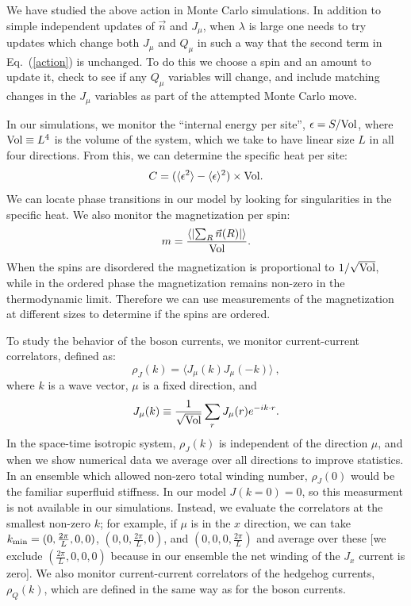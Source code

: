 \documentclass[prb,twocolumn]{revtex4-1}
\def\ra{\rangle} %
\def\la{\langle} %
\begin{document}
We have studied the above action in Monte Carlo simulations. In addition to simple independent updates of $\vec{n}$ and $J_\mu$, when $\lambda$ is large one needs to try updates which change both $J_\mu$ and $Q_\mu$ in such a way that the second term in Eq.~(\ref{action}) is unchanged. To do this we choose a spin and an amount to update it, check to see if any $Q_\mu$ variables will change, and include matching changes in the $J_\mu$ variables as part of the attempted Monte Carlo move.

In our simulations, we monitor the ``internal energy per site'', $\epsilon= S /{\rm Vol}$, where ${\rm Vol}\equiv L^4$ is the volume of the system, which we take to have linear size $L$ in all four directions. From this, we can determine the specific heat per site:
\begin{equation}
C=(\la \epsilon^2\ra-\la\epsilon\ra^2)\times{\rm Vol}.
\end{equation}
We can locate phase transitions in our model by looking for singularities in the specific heat. We also monitor the magnetization per spin:
\begin{equation}
m = \frac{\left\la \left|\sum_R \vec{n}(R) \right|\right\ra}{\rm Vol}.
\end{equation}
When the spins are disordered the magnetization is proportional to $1/\sqrt{\rm Vol}$, while in the ordered phase the magnetization remains non-zero in the thermodynamic limit. Therefore we can use measurements of the magnetization at different sizes to determine if the spins are ordered.

To study the behavior of the boson currents, we monitor current-current correlators, defined as:
\begin{equation}
\rho_{J}({k})=\la J_\mu({k})J_\mu(-{k})\ra ~,
\label{rho}
\end{equation}
where $k$ is a wave vector, $\mu$ is a fixed direction, and 
\begin{equation}
J_\mu({k})\equiv\frac{1}{\rm \sqrt{Vol}}\sum_r J_\mu(r)e^{-i{k}\cdot r}.
\end{equation}
In the space-time isotropic system, $\rho_J({k})$ is independent of the direction $\mu$, and when we show numerical data we average over all directions to improve statistics. In an ensemble which allowed non-zero total winding number, $\rho_J(0)$ would be the familiar superfluid stiffness. In our model $J(k=0)=0$, so this measurment is not available in our simulations. Instead, we evaluate the correlators at the smallest non-zero ${k}$; for example, if $\mu$ is in the $x$ direction, we can take ${k}_{\rm min}=(0,\frac{2\pi}{L},0,0)$, $(0,0,\frac{2\pi}{L},0)$, and $(0,0,0,\frac{2\pi}{L})$ and average over these [we exclude $(\frac{2\pi}{L},0,0,0)$ because in our ensemble the net winding of the $J_x$ current is zero]. We also monitor current-current correlators of the hedgehog currents, $\rho_Q(k)$, which are defined in the same way as for the boson currents.
\end{document}
